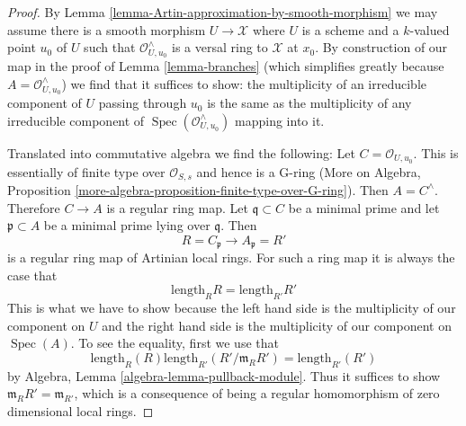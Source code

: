 \documentclass[10pt,a4paper]{amsart}
\theoremstyle{plain}
\theoremstyle{definition}
\theoremstyle{remark}
\numberwithin{equation}{subsection}
\def\Spec{\mathop{\mathrm{Spec}}}
\begin{document}
\begin{proof}
By Lemma \ref{lemma-Artin-approximation-by-smooth-morphism} we
may assume there is a smooth morphism $U \to \mathcal{X}$
where $U$ is a scheme and a $k$-valued point $u_0$ of $U$
such that $\mathcal{O}_{U, u_0}^\wedge$ is a versal ring to
$\mathcal{X}$ at $x_0$. By construction of our map in
the proof of Lemma \ref{lemma-branches} (which simplifies
greatly because $A = \mathcal{O}_{U, u_0}^\wedge$) we find
that it suffices to show: the multiplicity of an irreducible
component of $U$ passing through $u_0$ is the same as the
multiplicity of any irreducible component of
$\Spec(\mathcal{O}_{U, u_0}^\wedge)$ mapping into it.

\medskip\noindent
Translated into commutative algebra we find the following:
Let $C = \mathcal{O}_{U, u_0}$. This is essentially of finite type
over $\mathcal{O}_{S, s}$ and hence is a G-ring (More on Algebra,
Proposition \ref{more-algebra-proposition-finite-type-over-G-ring}).
Then $A = C^\wedge$. Therefore $C \to A$ is a regular ring map.
Let $\mathfrak q \subset C$ be a minimal prime and let $\mathfrak p \subset A$
be a minimal prime lying over $\mathfrak q$. Then
$$
R = C_\mathfrak p \longrightarrow A_\mathfrak p = R'
$$
is a regular ring map of Artinian local rings. For such a ring map
it is always the case that
$$
\text{length}_R R = \text{length}_{R'} R'
$$
This is what we have to show because the left hand side
is the multiplicity of our component on $U$ and the right hand
side is the multiplicity of our component on $\Spec(A)$.
To see the equality, first we use that
$$
\text{length}_R(R) \text{length}_{R'}(R'/\mathfrak m_R R') =
\text{length}_{R'}(R')
$$
by Algebra, Lemma \ref{algebra-lemma-pullback-module}. Thus it suffices
to show $\mathfrak m_R R' = \mathfrak m_{R'}$, which is a consequence
of being a regular homomorphism of zero dimensional local rings.
\end{proof}
\end{document}
